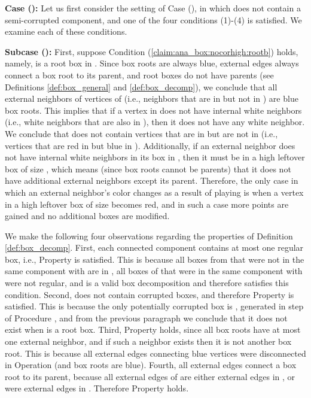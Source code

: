 \documentclass[11pt]{article}
\theoremstyle{definition}
\begin{document}
\bigskip
\par\noindent
{\bf Case ():}
Let us first consider the setting of Case (), in which  does not contain a semi-corrupted component, and one of the four conditions (1)-(4) is satisfied.
We examine each of these conditions.
\smallskip
\par\noindent
{\bf Subcase ():}
	First, suppose Condition (\ref{claim:ana_box:nocorhigh:rootb}) holds, namely,  is a root box in . 
	Since box roots are always blue, external edges always connect a box root to its parent, and root boxes do not have parents (see Definitions \ref{def:box_general} and \ref{def:box_decomp}),
	we conclude that all external neighbors of vertices of  (i.e., neighbors that are in  but not in ) are blue box roots.
	This implies that if a vertex in  does not have internal white neighbors (i.e., white neighbors that are also in ), then it does not have any white neighbor.
	We conclude that  does not contain vertices that are in  but are not in  (i.e., vertices that are red in  but blue in ). 
	Additionally, if an external neighbor  does not have internal white neighbors in its box in , then it must be in a high leftover box of size , 
	which means (since box roots cannot be parents) that it does not have additional external neighbors except its parent.
	Therefore, the only case in which an external neighbor's color changes as a result of playing  is when a vertex in a high leftover box of size  becomes red, and in such a case  more points are gained and no additional boxes are modified.
	
	We make the following four observations regarding the properties of Definition \ref{def:box_decomp}.
	First, each connected component contains at most one regular box, i.e., Property  is satisfied.
	This is because all boxes from  that were not in the same component with  are in , 
	all boxes of  that were in the same component with  were not regular,
	and  is a valid box decomposition and therefore satisfies this condition.	
	Second,  does not contain corrupted boxes, and therefore Property  is satisfied.
	This is because the only potentially corrupted box is , generated in step  of Procedure , and from the previous paragraph we conclude that it does not exist when  is a root box. 
	Third, Property  holds, since all box roots have at most one external neighbor, and if such a neighbor exists then it is not another box root.
	This is because all external edges connecting blue vertices were disconnected in Operation  (and box roots are blue).
	Fourth, all external edges connect a box root to its parent, 	
	because all external edges of  are either external edges in , or were external edges in .  
	Therefore Property  holds.
\end{document}
